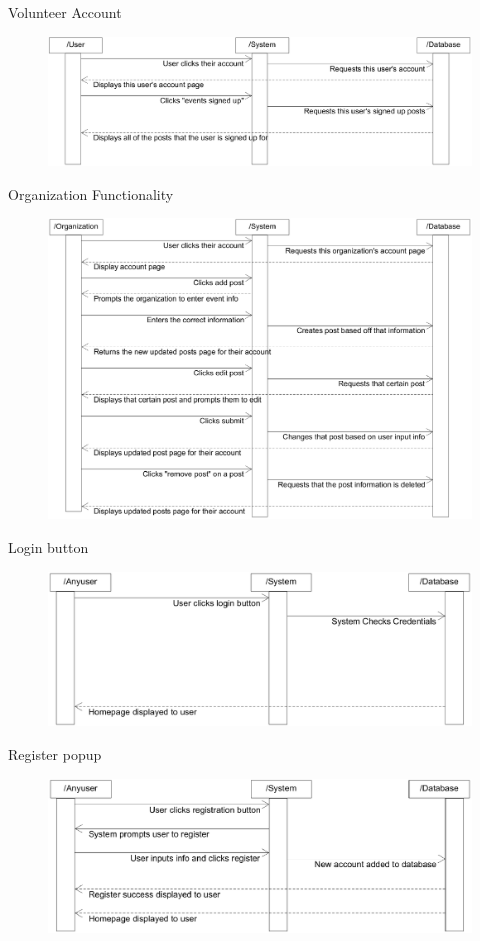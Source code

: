 \documentclass[12pt]{article}
\begin{document}
Volunteer Account
\begin{figure}[h!]
\includegraphics[width=\textwidth]{volunteeraccount}
\end{figure}
\pagebreak

Organization Functionality
\begin{figure}[h!]
\includegraphics[width=\textwidth]{organizationalfunctionality}
\end{figure}

Login button
\begin{figure}[h!]
\includegraphics[width=\textwidth]{loginbutton}
\end{figure}
\pagebreak

Register popup
\begin{figure}[h!]
\includegraphics[width=\textwidth]{registerpopup}
\end{figure}
\end{document}
